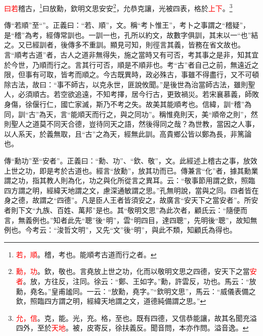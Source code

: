 \textcolor{red}{曰若}稽古，\footnote{\textcolor{red}{若，順}。稽，考也。能順考古道而行之者\textcolor{red}{}。}曰放勳，欽明文思安安\footnote{\textcolor{red}{勳，功}。欽，敬也。言堯放上世之功，化而以敬明文思之四德，安天下之當\textcolor{red}{安者}。放，方往反，注同。徐云：“鄭、王如字。”勳，許雲反，功也。馬云：“放勳，堯名。”皇甫謐同。一云：“放勳，堯字。”“欽明文思”，馬云：“威儀表備之欽，照臨四方謂之明，經緯天地謂之文，道德純備謂之思。”}，允恭克讓，光被四表，格於\textcolor{red}{上下}。\footnote{\textcolor{red}{允，信}。克，能。光，充。格，至也。既有四德，又信恭能讓，故其名聞充溢四外，至於\textcolor{red}{天地}。被，皮寄反，徐扶義反。聞音問，本亦作問。溢音逸。}

{\noindent\zhuan{}\fzbyks 傳“若順”至“”。正義曰：“若、順”，文。稱“考卜惟王”，考卜之事謂之“稽疑”，是“稽”為考，經傳常訓也。一訓一也，孔所以約文，故數字俱訓，其末以一“也”結之。又已經訓者，後傳多不重訓。顯見可知，則徑言其義，皆務在省文故也。言“順考古道”者，古人之道非無得失，施之當時又有可否，考其事之是非，知其宜於今世，乃順而行之。言其行可否，順是不順非也。考“古”者自己之前，無遠近之限，但事有可取，皆考而順之。今古既異時，政必殊古，事雖不得盡行，又不可頓除古法，故曰：“事不師古，以克永世，匪說攸聞。”是後世為治當師古法，雖則聖人，必須順古。若空欲追遠，不知考擇，居今行古，更致禍災。若宋襄慕義，師敗身傷，徐偃行仁，國亡家滅，斯乃不考之失。故美其能順考也。信緯，訓“稽”為同，訓“古”為天，言“能順天而行之，與之同功”。稱惟堯則天，美“順帝之則”，然則聖人之道莫不同天合德，豈待同天之語，然後得同之哉？為世教，當因之人事，以人系天，於義無取，且“古”之為天，經無此訓。高貴鄉公皆以鄭為長，非篤論也。 \par}

{\noindent\zhuan{}\fzbyks 傳“勳功”至“安者”。正義曰：“勳、功”、“欽、敬”，文。此經述上稽古之事，放效上世之功，即是考於古道也。經言“放勳”，放其功而已。傳兼言“化”者，據其勳業謂之功，指其教人則為化，功之與化所從言之異耳。云：“敬事節用謂之欽，照臨四方謂之明，經緯天地謂之文，慮深通敏謂之思。”孔無明說，當與之同。四者皆在身之德，故謂之“四德”。凡是臣人王者皆須安之，故廣言“安天下之當安者”。所安者則下文“九族、百姓、萬邦”是也。其“敬明文思”為此次者，顧氏云：“隨便而言，無義例也。”知者此先“聰”後“明”，雲“明四目，達四聰”，先明後“聰”，故知無例也。今考云：“浚哲文明”，又先“文”後“明”，與此不類，知顧氏為得也。 \par}

